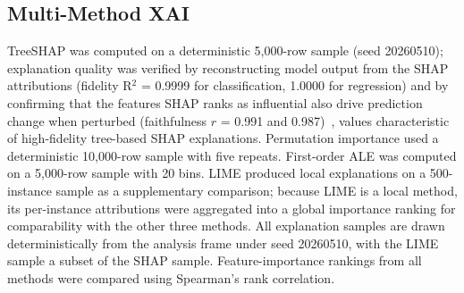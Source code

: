 \documentclass[journal]{IEEEtran}
\begin{document}
\subsection{Multi-Method XAI}
TreeSHAP was computed on a deterministic 5,000-row sample (seed 20260510); explanation quality was verified by reconstructing model output from the SHAP attributions (fidelity R$^2$ = 0.9999 for classification, 1.0000 for regression) and by confirming that the features SHAP ranks as influential also drive prediction change when perturbed (faithfulness $r$ = 0.991 and 0.987)~\cite{bodria2023benchmark}, values characteristic of high-fidelity tree-based SHAP explanations. Permutation importance used a deterministic 10,000-row sample with five repeats. First-order ALE was computed on a 5,000-row sample with 20 bins. LIME produced local explanations on a 500-instance sample as a supplementary comparison; because LIME is a local method, its per-instance attributions were aggregated into a global importance ranking for comparability with the other three methods. All explanation samples are drawn deterministically from the analysis frame under seed 20260510, with the LIME sample a subset of the SHAP sample. Feature-importance rankings from all methods were compared using Spearman's rank correlation.
\end{document}
